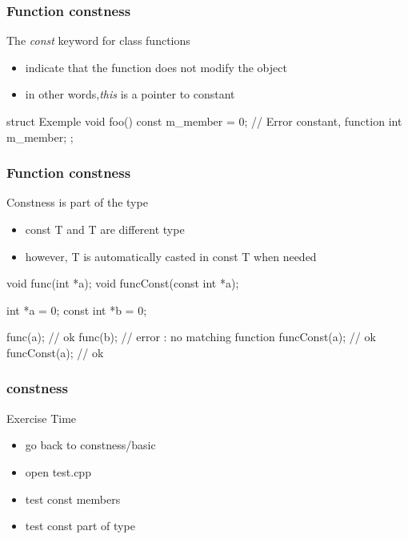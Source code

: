 \begin{frame}[fragile]
  \frametitle{Function constness}
  \begin{block}{The {\it const} keyword for class functions}
    \begin{itemize}
    \item indicate that the function does not modify the object
    \item in other words,{\it this} is a pointer to constant
    \end{itemize}
  \end{block}
  \begin{cppcode*}{}
    struct Exemple {
      void foo() const  {
        m_member = 0; // Error constant, function
      }
      int m_member;
    };
  \end{cppcode*}
\end{frame}

\begin{frame}[fragile]
  \frametitle{Function constness}
  \begin{block}{Constness is part of the type}
    \begin{itemize}
    \item const T and T are different type
    \item however, T is automatically casted in const T when needed
    \end{itemize}
  \end{block}
  \begin{cppcode*}{}
    void func(int *a);
    void funcConst(const int *a);

    int *a = 0;
    const int *b = 0;

    func(a);      // ok
    func(b);      // error : no matching function
    funcConst(a); // ok
    funcConst(a); // ok
  \end{cppcode*}
\end{frame}

\begin{frame}[fragile]
  \frametitle{constness}
  \begin{alertblock}{Exercise Time}
    \begin{itemize}
    \item go back to constness/basic
    \item open test.cpp
    \item test const members
    \item test const part of type
    \end{itemize}
  \end{alertblock}
\end{frame}



